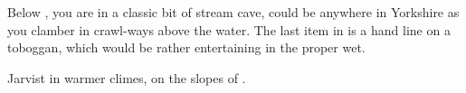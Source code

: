 Below , you are in a classic bit of stream cave, could be
anywhere in Yorkshire as you clamber in crawl-ways above the water. The
last item in  is a hand line on a toboggan, which would
be rather entertaining in the proper wet.


\begin{marginfigure}
\checkoddpage \ifoddpage \forcerectofloat \else \forceversofloat \fi
\centering
 \caption{Jarvist in warmer climes, on the slopes of . }
 \label{jarv kuk}
\end{marginfigure}


